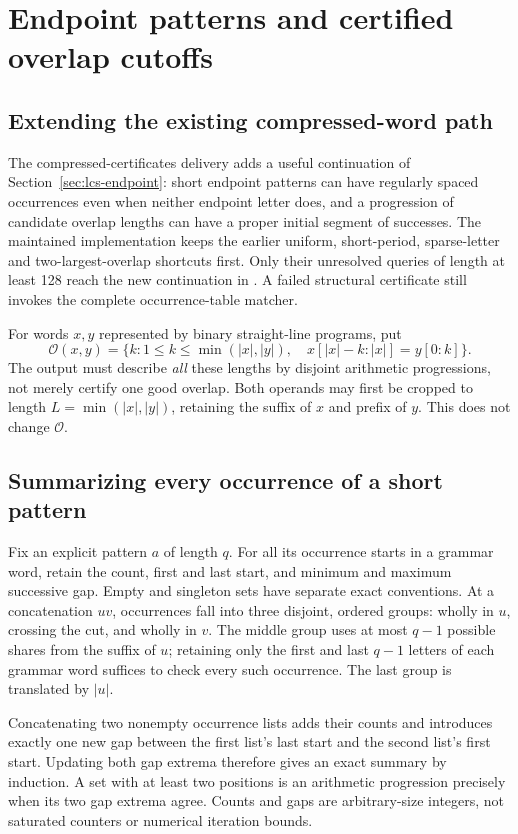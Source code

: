 \section{Endpoint patterns and certified overlap cutoffs}
\label{sec:endpoint-clipping}

\subsection{Extending the existing compressed-word path}
The compressed-certificates delivery adds a useful continuation of
Section~\ref{sec:lcs-endpoint}: short endpoint patterns can have regularly
spaced occurrences even when neither endpoint letter does, and a progression
of candidate overlap lengths can have a proper initial segment of successes.
The maintained implementation keeps the earlier uniform, short-period,
sparse-letter and two-largest-overlap shortcuts first. Only their unresolved
queries of length at least 128 reach the new continuation in
. A failed structural certificate
still invokes the complete occurrence-table matcher.

For words $x,y$ represented by binary straight-line programs, put
\[
 \mathcal O(x,y)=\{k:1\le k\le\min(|x|,|y|),\quad
     x[|x|-k:|x|]=y[0:k]\}.
\]
The output must describe \emph{all} these lengths by disjoint arithmetic
progressions, not merely certify one good overlap. Both operands may first
be cropped to length $L=\min(|x|,|y|)$, retaining the suffix of $x$ and
prefix of $y$. This does not change $\mathcal O$.

\subsection{Summarizing every occurrence of a short pattern}
Fix an explicit pattern $a$ of length $q$. For all its occurrence starts in
a grammar word, retain the count, first and last start, and minimum and
maximum successive gap. Empty and singleton sets have separate exact
conventions. At a concatenation $uv$, occurrences fall into three disjoint,
ordered groups: wholly in $u$, crossing the cut, and wholly in $v$.
The middle group uses at most $q-1$ possible shares from the suffix of $u$;
retaining only the first and last $q-1$ letters of each grammar word suffices
to check every such occurrence. The last group is translated by $|u|$.

Concatenating two nonempty occurrence lists adds their counts and introduces
exactly one new gap between the first list's last start and the second list's
first start. Updating both gap extrema therefore gives an exact summary by
induction. A set with at least two positions is an arithmetic progression
precisely when its two gap extrema agree. Counts and gaps are arbitrary-size
integers, not saturated counters or numerical iteration bounds.

